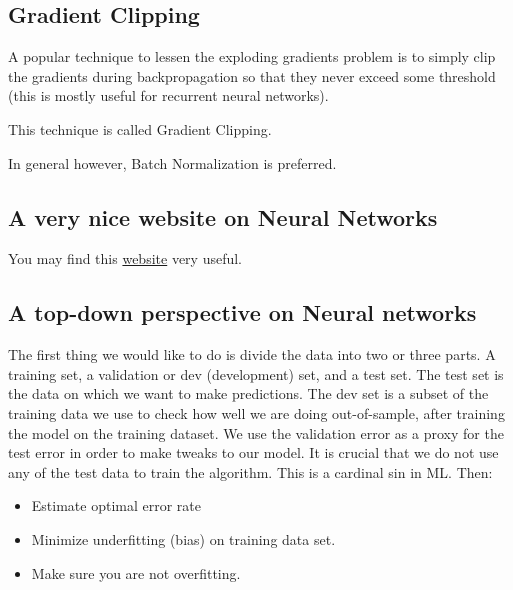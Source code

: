 \documentclass[%
oneside,                 %
final,                   %
10pt]{article}
\begin{document}
\subsection{Gradient Clipping}

A popular technique to lessen the exploding gradients problem is to
simply clip the gradients during backpropagation so that they never
exceed some threshold (this is mostly useful for recurrent neural
networks).

This technique is called Gradient Clipping.

In general however, Batch
Normalization is preferred.

\subsection{A very nice website on Neural Networks}

You may find this \href{{https://playground.tensorflow.org/#activation=tanh&batchSize=10&dataset=circle&regDataset=reg-plane&learningRate=0.03&regularizationRate=0&noise=0&networkShape=4,2&seed=0.29243&showTestData=false&discretize=false&percTrainData=50&x=true&y=true&xTimesY=false&xSquared=false&ySquared=false&cosX=false&sinX=false&cosY=false&sinY=false&collectStats=false&problem=classification&initZero=false&hideText=false}}{website} very useful. 

\subsection{A top-down perspective on Neural networks}

The first thing we would like to do is divide the data into two or
three parts. A training set, a validation or dev (development) set,
and a test set. The test set is the data on which we want to make
predictions. The dev set is a subset of the training data we use to
check how well we are doing out-of-sample, after training the model on
the training dataset. We use the validation error as a proxy for the
test error in order to make tweaks to our model. It is crucial that we
do not use any of the test data to train the algorithm. This is a
cardinal sin in ML. Then:

\begin{itemize}
\item Estimate optimal error rate

\item Minimize underfitting (bias) on training data set.

\item Make sure you are not overfitting.
\end{itemize}
\end{document}

